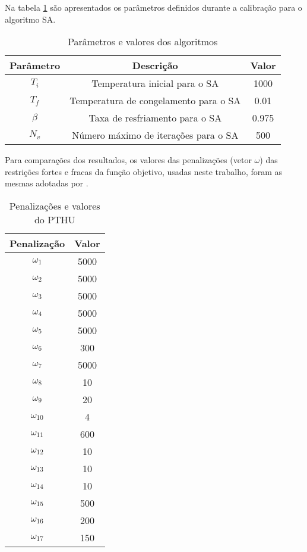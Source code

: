 Na tabela \ref{tbl_param} são apresentados os parâmetros definidos durante a calibração para o algoritmo SA.


\begin{table}[!htbp]
\centering
\begin{tabular}{c|c|c}
\hline \hline
\textbf{Parâmetro} & \textbf{Descrição} & \textbf{Valor} \\ \hline
\(T_{i}\) & Temperatura inicial para o SA & 1000 \\
\(T_{f}\) & Temperatura de congelamento para o SA & 0.01 \\
\(\beta\) & Taxa de resfriamento para o SA & 0.975 \\
\(N_{v}\) & Número máximo de iterações para o SA & 500 \\ \hline \hline
\end{tabular}
\caption{Parâmetros e valores dos algoritmos}
\label{tbl_param}
\end{table}

Para comparações dos resultados, os valores das penalizações (vetor \(\omega\)) das restrições fortes e fracas da função objetivo, usadas neste trabalho, foram as mesmas adotadas por .

\begin{table}[!htbp]
\centering
\begin{tabular}{c|c}
\hline \hline
\textbf{Penalização} & \textbf{Valor} \\ \hline
\(\omega_{1}\) & 5000 \\
\(\omega_{2}\) & 5000 \\
\(\omega_{3}\) & 5000 \\
\(\omega_{4}\) & 5000 \\
\(\omega_{5}\) & 5000 \\
\(\omega_{6}\) & 300 \\
\(\omega_{7}\) & 5000 \\
\(\omega_{8}\) & 10 \\
\(\omega_{9}\) & 20 \\
\(\omega_{10}\) & 4 \\
\(\omega_{11}\) & 600 \\
\(\omega_{12}\) & 10 \\
\(\omega_{13}\) & 10 \\
\(\omega_{14}\) & 10 \\
\(\omega_{15}\) & 500 \\
\(\omega_{16}\) & 200 \\
\(\omega_{17}\) & 150 \\ \hline \hline
\end{tabular}
\caption{Penalizações e valores do PTHU}
\label{tbl_penal}
\end{table}


